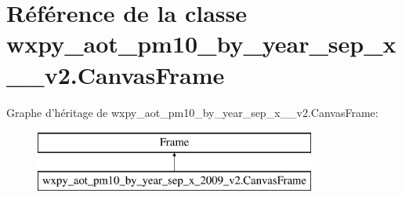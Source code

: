 \hypertarget{classwxpy__aot__pm10__by__year__sep__x__2009__v2_1_1_canvas_frame}{\section{Référence de la classe wxpy\-\_\-aot\-\_\-pm10\-\_\-by\-\_\-year\-\_\-sep\-\_\-x\-\_\-\_\-v2.\-Canvas\-Frame}
\label{classwxpy__aot__pm10__by__year__sep__x__2009__v2_1_1_canvas_frame}
}
Graphe d'héritage de wxpy\-\_\-aot\-\_\-pm10\-\_\-by\-\_\-year\-\_\-sep\-\_\-x\-\_\-\_\-v2.\-Canvas\-Frame\-:\begin{figure}[H]
\begin{center}
\leavevmode
\includegraphics[height=2.000000cm]{classwxpy__aot__pm10__by__year__sep__x__2009__v2_1_1_canvas_frame}
\end{center}
\end{figure}
